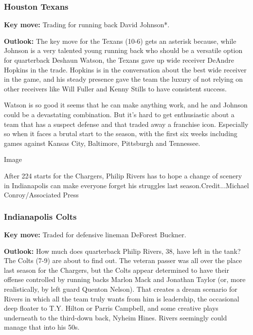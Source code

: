\hypertarget{houston-texans}{%
\subsubsection{\texorpdfstring{\textbf{Houston
Texans}}{Houston Texans}}\label{houston-texans}}

\textbf{Key move:} Trading for running back David Johnson*.

\textbf{Outlook:} The key move for the Texans (10-6) gets an asterisk
because, while Johnson is a very talented young running back who should
be a versatile option for quarterback Deshaun Watson, the Texans gave up
wide receiver DeAndre Hopkins in the trade. Hopkins is in the
conversation about the best wide receiver in the game, and his steady
presence gave the team the luxury of not relying on other receivers like
Will Fuller and Kenny Stills to have consistent success.

Watson is so good it seems that he can make anything work, and he and
Johnson could be a devastating combination. But it's hard to get
enthusiastic about a team that has a suspect defense and that traded
away a franchise icon. Especially so when it faces a brutal start to the
season, with the first six weeks including games against Kansas City,
Baltimore, Pittsburgh and Tennessee.

Image

After 224 starts for the Chargers, Philip Rivers has to hope a change of
scenery in Indianapolis can make everyone forget his struggles last
season.Credit...Michael Conroy/Associated Press

\hypertarget{indianapolis-colts}{%
\subsubsection{\texorpdfstring{\textbf{Indianapolis
Colts}}{Indianapolis Colts}}\label{indianapolis-colts}}

\textbf{Key move:} Traded for defensive lineman DeForest Buckner.

\textbf{Outlook:} How much does quarterback Philip Rivers, 38, have left
in the tank? The Colts (7-9) are about to find out. The veteran passer
was all over the place last season for the Chargers, but the Colts
appear determined to have their offense controlled by running backs
Marlon Mack and Jonathan Taylor (or, more realistically, by left guard
Quenton Nelson). That creates a dream scenario for Rivers in which all
the team truly wants from him is leadership, the occasional deep floater
to T.Y. Hilton or Parris Campbell, and some creative plays underneath to
the third-down back, Nyheim Hines. Rivers seemingly could manage that
into his 50s.

